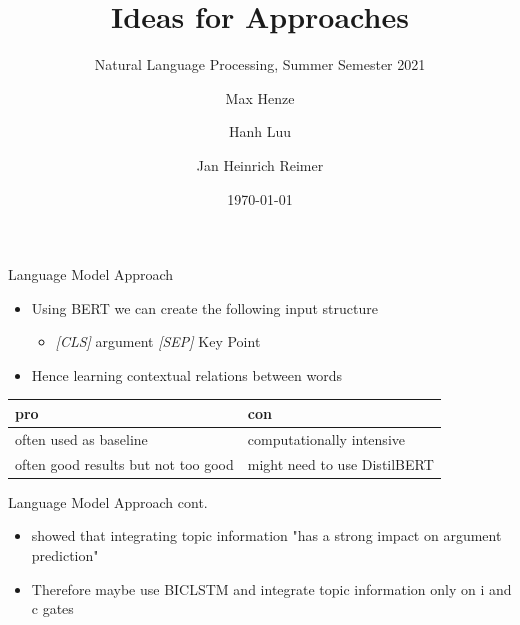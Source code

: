 \documentclass[english,handout]{mlutalk}
\title{Ideas for Approaches}
\subtitle{Natural Language Processing, Summer Semester 2021}
\author{Max Henze \and Hanh Luu \and Jan Heinrich Reimer}
\institute{Martin Luther University Halle-Wittenberg}
\date{\today}
\begin{document}
\titleframe


\begin{frame}{Language Model Approach}
  
  \begin{itemize}
    \item Using BERT we can create the following input structure\\
      \begin{itemize}
        \item \textit{[CLS]} argument \textit{[SEP]} Key Point
      \end{itemize}
    \item Hence learning contextual relations between words
  \end{itemize}

  \begin{tabular}{ll}
    \toprule
      pro & con \\
    \midrule
      often used as baseline & computationally intensive \\
      often good results but not too good & might need to use DistilBERT\\
    \bottomrule
  \end{tabular}

\end{frame}

\begin{frame}{Language Model Approach cont.}
  
    \begin{itemize}
      \item \cite{StabMSRG2018} showed that integrating topic information "has a strong impact on argument prediction"
      \item Therefore maybe use BICLSTM and integrate topic information only on i and c gates
    \end{itemize}
  
\end{frame}



\appendix
\section{\appendixname}

\bibliographyframe
\end{document}
